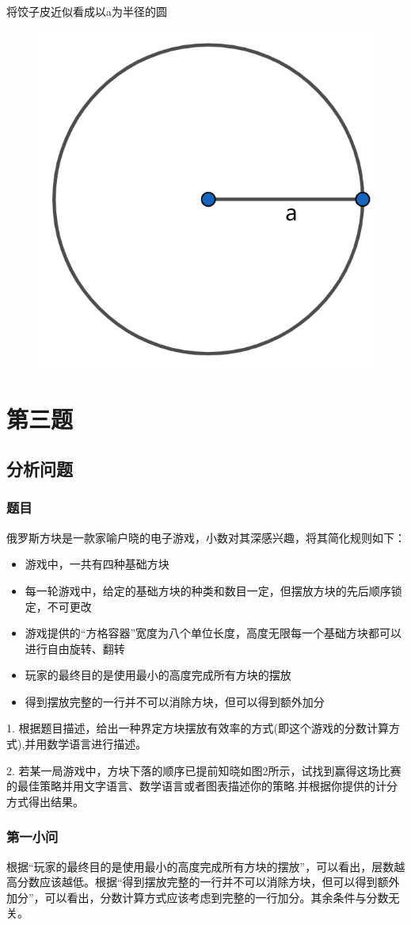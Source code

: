 \documentclass[lang=cn,a4paper]{elegantpaper}
\begin{document}
    将饺子皮近似看成以a为半径的圆
    \begin{figure}[H]
        \centering
        \includegraphics[scale=0.4]{circle.png}
    \end{figure}

    \section{第三题}
    \subsection{分析问题}
    \subsubsection*{题目}
    俄罗斯方块是一款家喻户晓的电子游戏，小数对其深感兴趣，将其简化规则如下：
    \begin{itemize}
        \item 游戏中，一共有四种基础方块
        \item 每一轮游戏中，给定的基础方块的种类和数目一定，但摆放方块的先后顺序锁定，不可更改
        \item 游戏提供的“方格容器”宽度为八个单位长度，高度无限每一个基础方块都可以进行自由旋转、翻转
        \item 玩家的最终目的是使用最小的高度完成所有方块的摆放
        \item 得到摆放完整的一行并不可以消除方块，但可以得到额外加分
    \end{itemize}

    1. 根据题目描述，给出一种界定方块摆放有效率的方式(即这个游戏的分数计算方式),并用数学语言进行描述。

    2. 若某一局游戏中，方块下落的顺序已提前知晓如图2所示，试找到赢得这场比赛的最佳策略并用文字语言、数学语言或者图表描述你的策略.并根据你提供的计分方式得出结果。
    \subsubsection{第一小问}
    根据“玩家的最终目的是使用最小的高度完成所有方块的摆放”，可以看出，层数越高分数应该越低。根据“得到摆放完整的一行并不可以消除方块，但可以得到额外加分”，可以看出，分数计算方式应该考虑到完整的一行加分。其余条件与分数无关。
\end{document}
